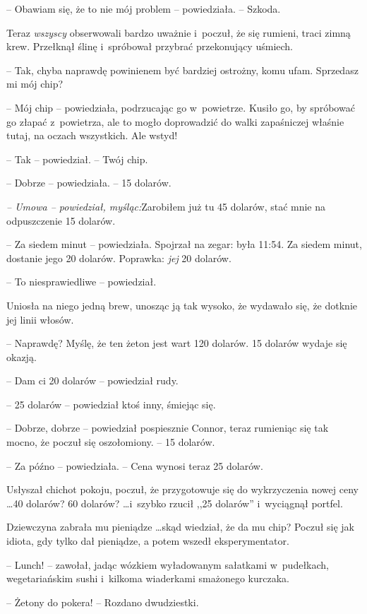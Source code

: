 \documentclass[oneside,polish,11pt,rmheadings]{mwbk}
\begin{document}
-- Obawiam się, że to nie mój problem -- powiedziała. -- Szkoda.

Teraz \textit{wszyscy }obserwowali bardzo uważnie i~poczuł, że się rumieni, traci zimną krew. Przełknął ślinę i~spróbował przybrać przekonujący uśmiech. 

-- Tak, chyba naprawdę powinienem być bardziej ostrożny, komu ufam. Sprzedasz mi mój chip? 

-- Mój chip -- powiedziała, podrzucając go w~powietrze. Kusiło go, by spróbować go złapać z~powietrza, ale to mogło doprowadzić do walki zapaśniczej właśnie tutaj, na oczach wszystkich. Ale wstyd!

-- Tak -- powiedział. -- Twój chip. 

-- Dobrze -- powiedziała. -- 15 dolarów.

\textit{-- Umowa -- powiedział, myśląc:}Zarobiłem już tu 45 dolarów, stać mnie na odpuszczenie 15 dolarów.\textit{ }

-- Za siedem minut -- powiedziała. Spojrzał na zegar: była 11:54. Za siedem minut, dostanie jego 20 dolarów. Poprawka: \textit{jej }20 dolarów.

-- To niesprawiedliwe -- powiedział.

Uniosła na niego jedną brew, unosząc ją tak wysoko, że wydawało się, że dotknie jej linii włosów. 

-- Naprawdę? Myślę, że ten żeton jest wart 120 dolarów. 15 dolarów wydaje się okazją.

-- Dam ci 20 dolarów -- powiedział rudy.

-- 25 dolarów -- powiedział ktoś inny, śmiejąc się.

-- Dobrze, dobrze -- powiedział pospiesznie Connor, teraz rumieniąc się tak mocno, że poczuł się oszołomiony. -- 15 dolarów.

-- Za późno -- powiedziała. -- Cena wynosi teraz 25 dolarów.

Usłyszał chichot pokoju, poczuł, że przygotowuje się do wykrzyczenia nowej ceny  \ldots  40 dolarów? 60 dolarów?  \ldots  i~szybko rzucił ,,25 dolarów'' i~wyciągnął portfel.

Dziewczyna zabrała mu pieniądze  \ldots  skąd wiedział, że da mu chip? Poczuł się jak idiota, gdy tylko dał pieniądze, a potem wszedł eksperymentator. 

-- Lunch! -- zawołał, jadąc wózkiem wyładowanym sałatkami w~pudełkach, wegetariańskim sushi i~kilkoma wiaderkami smażonego kurczaka. 

-- Żetony do pokera! -- Rozdano dwudziestki.
\end{document}
